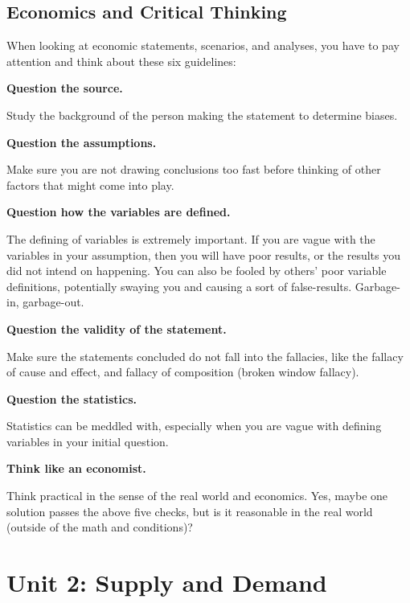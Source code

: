 \documentclass[a4paper, 12pt] {article}
\begin{document}
\subsection{Economics and Critical Thinking}
When looking at economic statements, scenarios, and analyses, you have to pay
attention and think about these six guidelines:
\begin{compactenum}
    \item \textbf{Question the source.}
        
        Study the background of the person making the statement to determine
        biases.
    \item \textbf{Question the assumptions.}

        Make sure you are not drawing conclusions too fast before thinking of 
        other factors that might come into play.
    \item \textbf{Question how the variables are defined.}
        
        The defining of variables is extremely important. If you are vague with
        the variables in your assumption, then you will have poor results, or
        the results you did not intend on happening. You can also be fooled by
        others' poor variable definitions, potentially swaying you and causing
        a sort of false-results. Garbage-in, garbage-out.
    \item \textbf{Question the validity of the statement.}

        Make sure the statements concluded do not fall into the fallacies, like
        the fallacy of cause and effect, and fallacy of composition (broken window
        fallacy).
    \item \textbf{Question the statistics.}

        Statistics can be meddled with, especially when you are vague with
        defining variables in your initial question.
    \item \textbf{Think like an economist.}
        
        Think practical in the sense of the real world and economics. Yes, maybe
        one solution passes the above five checks, but is it reasonable in the
        real world (outside of the math and conditions)?
\end{compactenum}

\section{Unit 2: Supply and Demand}
\end{document}
